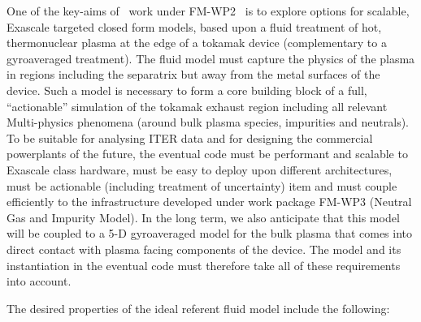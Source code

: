 
One of the key-aims of \nep \   work under FM-WP2~\cite{sciplan} is to explore options for 
scalable, Exascale targeted closed form models, based upon a fluid treatment of 
hot, thermonuclear plasma at the edge of a tokamak device (complementary to a 
gyroaveraged treatment). The fluid model must capture the physics of the plasma in 
regions including the separatrix but away from the metal surfaces of the device. 
Such a model is necessary to form a core building block of a full, ``actionable'' 
simulation of the tokamak exhaust region including all relevant Multi-physics phenomena 
(around bulk plasma species, impurities and neutrals). To be suitable for analysing 
ITER data and for designing the commercial powerplants of the future, the eventual 
code must be performant and scalable to Exascale class hardware, must be easy to 
deploy upon different architectures, must be actionable (including treatment of uncertainty)
item and must couple efficiently to the infrastructure developed under 
work package FM-WP3 (Neutral Gas and Impurity Model). In the long term, we also 
anticipate that this model will be coupled to a 5-D gyroaveraged model for the bulk 
plasma that comes into direct contact with plasma facing components of the device. 
The model and its instantiation in the eventual code must therefore take all of 
these requirements into account.

The desired properties of the ideal referent fluid model include the following:

